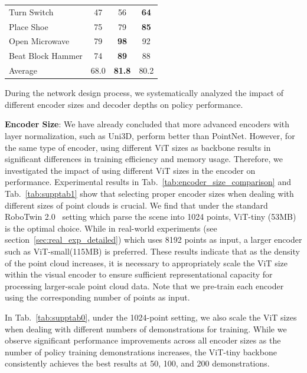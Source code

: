 \documentclass[runningheads]{llncs}
\begin{document}
\begin{table}[b]
\begin{minipage}[t]{0.48\textwidth}
{\begin{tabular}{l|ccc}
                Turn Switch        & 47 & 56 & \cellcolor{myblue}\textbf{64} \\
                Place Shoe         & 75 & 79 & \cellcolor{myblue}\textbf{85} \\
                Open Microwave     & 79 & \cellcolor{myblue}\textbf{98} & 92 \\
                Beat Block Hammer  & 74 & \cellcolor{myblue}\textbf{89} & 88 \\
                \midrule
                Average            & 68.0 & \cellcolor{myblue}\textbf{81.8} & 80.2 \\
                \bottomrule
            \end{tabular}
        }
    \end{minipage}
\end{table}
During the network design process, we systematically analyzed the impact of different encoder sizes and decoder depths on policy performance.

\textbf{Encoder Size}: We have already concluded that more advanced encoders with layer normalization, such as Uni3D\cite{zhou2023uni3d}, perform better than PointNet\cite{qi2017pointnet}. However, for the same type of encoder, using different ViT sizes as backbone results in significant differences in training efficiency and memory usage. Therefore, we investigated the impact of using different ViT sizes in the encoder on performance. Experimental results in Tab.~\ref{tab:encoder_size_comparison} and Tab.~\ref{tab:supptab1} show that selecting proper encoder sizes when dealing with different sizes of point clouds is crucial. We find that under the standard RoboTwin 2.0~\cite{chen2025robotwin} setting which parse the scene into 1024 points, ViT-tiny (53MB) is the optimal choice. While in real-world experiments (see section~\ref{sec:real_exp_detailed}) which uses 8192 points as input, a larger encoder such as ViT-small(115MB) is preferred. These results indicate that as the density of the point cloud increases, it is necessary to appropriately scale the ViT size within the visual encoder to ensure sufficient representational capacity for processing larger-scale point cloud data. Note that we pre-train each encoder using the corresponding number of points as input.

In Tab.~\ref{tab:supptab0}, under the 1024-point setting, we also scale the ViT sizes when dealing with different numbers of demonstrations for training. While we observe significant performance improvements across all encoder sizes as the number of policy training demonstrations increases, the ViT-tiny backbone consistently achieves the best results at 50, 100, and 200 demonstrations.
\end{document}

